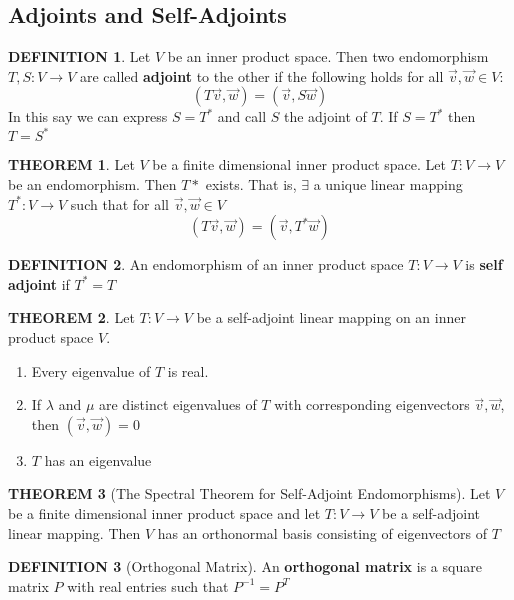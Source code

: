 \documentclass[12pt]{article}
\theoremstyle{definition}
\newtheorem{definition}{DEFINITION}[subsection]
\newtheorem{theorem}{THEOREM}[subsection]
\begin{document}
\subsection{Adjoints and Self-Adjoints}
\begin{definition}
    Let $V$ be an inner product space. Then two endomorphism $T,S:V \rightarrow V$ are called \textbf{adjoint} to the other if the following holds for all $\vec{v}, \vec{w} \in V$: $$(T\vec{v}, \vec{w}) = (\vec{v}, S\vec{w})$$
    In this say we can express $S = T^*$ and call $S$ the adjoint of $T$. If $S = T^*$ then $T=S^*$
\end{definition}

\begin{theorem}
    Let $V$ be a finite dimensional inner product space. Let $T:V \rightarrow V$ be an endomorphism. Then $T*$ exists. That is, $\exists$ a unique linear mapping $T^*: V \rightarrow V$ such that for all $\vec{v}, \vec{w} \in V$
    $$(T\vec{v}, \vec{w}) = (\vec{v}, T^*\vec{w})$$
\end{theorem}

\begin{definition}
    An endomorphism of an inner product space $T:V \rightarrow V$ is \textbf{self adjoint} if $T^* = T$
\end{definition}

\begin{theorem}
    Let $T:V \rightarrow V$ be a self-adjoint linear mapping on an inner product space $V$.
    \begin{enumerate}
        \item Every eigenvalue of $T$ is real.
        \item If $\lambda$ and $\mu$ are distinct eigenvalues of $T$ with corresponding eigenvectors $\vec{v}, \vec{w}$, then $(\vec{v}, \vec{w}) = 0$
        \item $T$ has an eigenvalue
    \end{enumerate}
\end{theorem}

\begin{theorem}[The Spectral Theorem for Self-Adjoint Endomorphisms]
    Let $V$ be a finite dimensional inner product space and let $T:V \rightarrow V$ be a self-adjoint linear mapping. Then $V$ has an orthonormal basis consisting of eigenvectors of $T$
\end{theorem}

\begin{definition}[Orthogonal Matrix]
    An \textbf{orthogonal matrix} is a square matrix $P$ with real entries such that $P^{-1} = P^T$ 
\end{definition}
\end{document}
